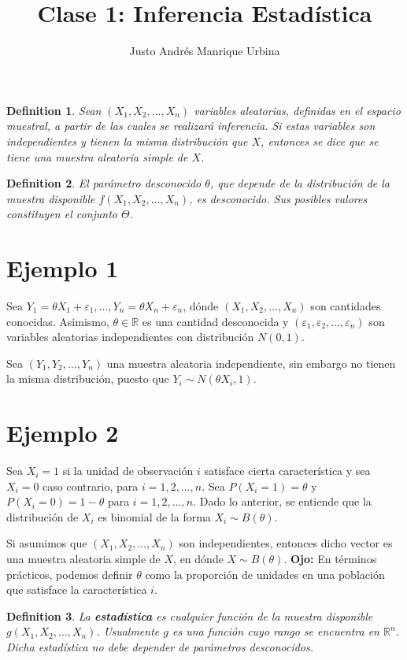 \documentclass{article}
\title{Clase 1: Inferencia Estadística}
\author{Justo Andrés Manrique Urbina}
\newtheorem{mydef}{Definition}
\begin{document}
\maketitle
\begin{mydef}
Sean $(X_{1},X_{2},\ldots,X_{n})$ variables aleatorias, definidas en el espacio muestral, a partir de las cuales se realizará inferencia. Si estas variables son independientes y tienen la misma distribución que $X$, entonces se dice que se tiene una muestra aleatoria simple de $X$.
\end{mydef}
\begin{mydef}
	El parámetro desconocido $\theta$, que depende de la distribución de la muestra disponible $f(X_{1},X_{2},\ldots,X_{n})$, es desconocido. Sus posibles valores constituyen el conjunto $\Theta$.
\end{mydef}
\section{Ejemplo 1}
Sea $Y_{1}=\theta X_{1} + \varepsilon_{1},\ldots,Y_{n}=\theta X_{n} + \varepsilon_{n}$, dónde $(X_{1},X_{2},\ldots,X_{n})$ son cantidades conocidas. Asimismo, $\theta \in \mathbb{R}$ es una cantidad desconocida y $(\varepsilon_{1},\varepsilon_{2},\ldots,\varepsilon_{n})$ son variables aleatorias independientes con distribución $N(0,1)$.

Sea $(Y_{1},Y_{2},\ldots,Y_{n})$ una muestra aleatoria independiente, sin embargo no tienen la misma distribución, puesto que $Y_{i}\sim N(\theta X_{i},1)$.
\section{Ejemplo 2}
Sea $X_{i}=1$ si la unidad de observación $i$ satisface cierta característica y sea $X_{i}=0$ caso contrario, para $i=1,2,\ldots,n$. Sea $P(X_{i}=1)=\theta$ y $P(X_{i}=0)=1-\theta$ para $i=1,2,\ldots,n$. Dado lo anterior, se entiende que la distribución de $X_{i}$ es binomial de la forma $X_{i}\sim B(\theta)$.

Si asumimos que $(X_{1},X_{2},\ldots,X_{n})$ son independientes, entonces dicho vector es una muestra aleatoria simple de $X$, en dónde $X\sim B(\theta)$. \textbf{Ojo:} En términos prácticos, podemos definir $\theta$ como la proporción de unidades en una población que satisface la característica $i$.

\begin{mydef}
	La \textbf{estadística} es cualquier función de la muestra disponible $g(X_{1},X_{2},\ldots,X_{n})$. Usualmente $g$ es una función cuyo rango se encuentra en $\mathbb{R}^{n}$. Dicha estadística no debe depender de parámetros desconocidos.
\end{mydef}
\end{document}

